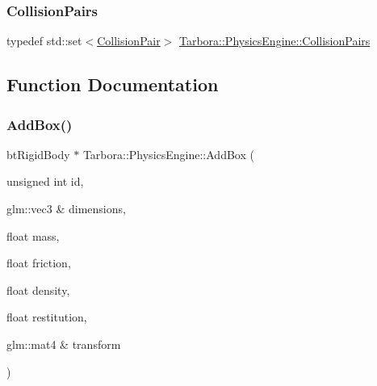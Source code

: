 \mbox{\label{namespaceTarbora_1_1PhysicsEngine_af696c3b94fb96f65c63f51e52b0e7238}} 
\subsubsection{\texorpdfstring{Collision\+Pairs}{CollisionPairs}}
{\footnotesize\ttfamily typedef std\+::set$<$\hyperlink{namespaceTarbora_1_1PhysicsEngine_a4f1d409d44b0a7cde617d3a30ed02b02}{Collision\+Pair}$>$ \hyperlink{namespaceTarbora_1_1PhysicsEngine_af696c3b94fb96f65c63f51e52b0e7238}{Tarbora\+::\+Physics\+Engine\+::\+Collision\+Pairs}}



\subsection{Function Documentation}
\mbox{\label{namespaceTarbora_1_1PhysicsEngine_a948faad823ce1e338a86d61c226e679e}} 
\subsubsection{\texorpdfstring{Add\+Box()}{AddBox()}}
{\footnotesize\ttfamily bt\+Rigid\+Body $\ast$ Tarbora\+::\+Physics\+Engine\+::\+Add\+Box (\begin{DoxyParamCaption}\item[{unsigned int}]{id,  }\item[{glm\+::vec3 \&}]{dimensions,  }\item[{float}]{mass,  }\item[{float}]{friction,  }\item[{float}]{density,  }\item[{float}]{restitution,  }\item[{glm\+::mat4 \&}]{transform }\end{DoxyParamCaption})}

\mbox{\label{namespaceTarbora_1_1PhysicsEngine_aabb5cc7e74e00e34239fd621939e9dec}} 
